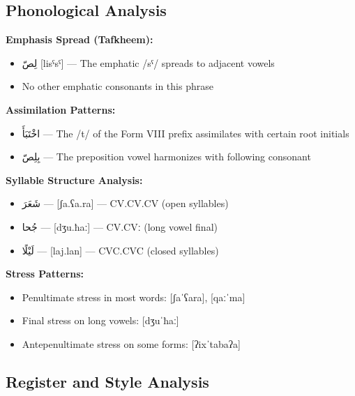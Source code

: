 \documentclass[letter,12pt]{article}
\begin{document}
\subsection{Phonological Analysis}

\begin{tcolorbox}[colback=white,colframe=dialectcolor,title=\textbf{Phonological Features},breakable]
\textbf{Emphasis Spread (Tafkheem):}
\begin{itemize}
\item \textarabic{لِصّ} [lisˤsˤ] — The emphatic /sˤ/ spreads to adjacent vowels
\item No other emphatic consonants in this phrase
\end{itemize}

\textbf{Assimilation Patterns:}
\begin{itemize}
\item \textarabic{اخْتَبَأَ} — The /t/ of the Form VIII prefix assimilates with certain root initials
\item \textarabic{بِلِصّ} — The preposition vowel harmonizes with following consonant
\end{itemize}

\textbf{Syllable Structure Analysis:}
\begin{itemize}
\item \textarabic{شَعَرَ} — [ʃa.ʕa.ra] — CV.CV.CV (open syllables)
\item \textarabic{جُحا} — [dʒu.ħaː] — CV.CVː (long vowel final)
\item \textarabic{لَيْلًا} — [laj.lan] — CVC.CVC (closed syllables)
\end{itemize}

\textbf{Stress Patterns:}
\begin{itemize}
\item Penultimate stress in most words: [ʃaˈʕara], [qaːˈma]
\item Final stress on long vowels: [dʒuˈħaː]
\item Antepenultimate stress on some forms: [ʔixˈtabaʔa]
\end{itemize}
\end{tcolorbox}

\subsection{Register and Style Analysis}
\end{document}
